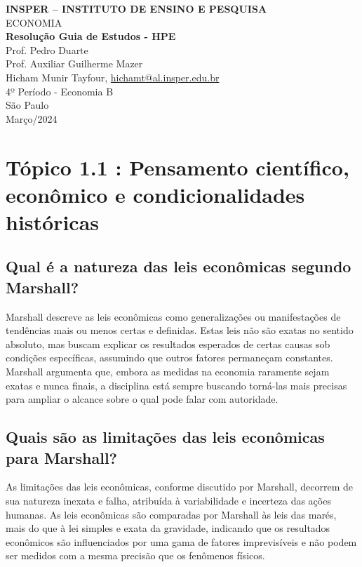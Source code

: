 \documentclass[a4paper,12pt]{article}[abntex2]
\begin{document}
\begin{titlepage}
    \centering
    \vspace*{1cm}
    \Large\textbf{INSPER – INSTITUTO DE ENSINO E PESQUISA}\\
    \Large ECONOMIA\\
    \vspace{1.5cm}
    \Large\textbf{Resolução Guia de Estudos - HPE}\\
    \vspace{1.5cm}
    Prof. Pedro Duarte\\
    Prof. Auxiliar Guilherme Mazer\\
    \vfill
    \normalsize
    Hicham Munir Tayfour, \href{mailto:hichamt@al.insper.edu.br}{hichamt@al.insper.edu.br}\\
    4º Período - Economia B\\
    \vfill
    São Paulo\\
    Março/2024
\end{titlepage}

\newpage
\tableofcontents
\thispagestyle{empty} %
\newpage
\setcounter{page}{1} %
\justify
\onehalfspacing

\pagestyle{fancy}
\fancyhf{}
\rhead{\thepage}

\section{\textbf{Tópico 1.1 : Pensamento científico, econômico e condicionalidades históricas}}
\subsection{\textbf{Qual é a natureza das leis econômicas segundo Marshall?}}
Marshall descreve as leis econômicas como generalizações ou manifestações de tendências mais ou menos certas e definidas. Estas leis não são exatas no sentido absoluto, mas buscam explicar os resultados esperados de certas causas sob condições específicas, assumindo que outros fatores permaneçam constantes. Marshall argumenta que, embora as medidas na economia raramente sejam exatas e nunca finais, a disciplina está sempre buscando torná-las mais precisas para ampliar o alcance sobre o qual pode falar com autoridade.
\subsection{\textbf{Quais são as limitações das leis econômicas para Marshall?}}
As limitações das leis econômicas, conforme discutido por Marshall, decorrem de sua natureza inexata e falha, atribuída à variabilidade e incerteza das ações humanas. As leis econômicas são comparadas por Marshall às leis das marés, mais do que à lei simples e exata da gravidade, indicando que os resultados econômicos são influenciados por uma gama de fatores imprevisíveis e não podem ser medidos com a mesma precisão que os fenômenos físicos.
\end{document}
